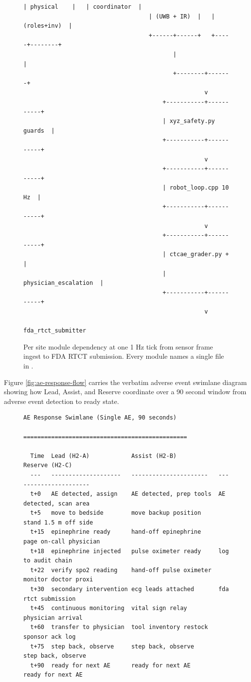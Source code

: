 \begin{sectionaccent}
\begin{figure}[H]
\begin{Verbatim}[fontsize=\footnotesize]
                                    | physical    |   | coordinator  |
                                    | (UWB + IR)  |   | (roles+inv)  |
                                    +------+------+   +-----+--------+
                                           |                |
                                           +--------+-------+
                                                    v
                                        +-----------+-----------+
                                        | xyz_safety.py guards  |
                                        +-----------+-----------+
                                                    v
                                        +-----------+-----------+
                                        | robot_loop.cpp 10 Hz  |
                                        +-----------+-----------+
                                                    v
                                        +-----------+-----------+
                                        | ctcae_grader.py +     |
                                        | physician_escalation  |
                                        +-----------+-----------+
                                                    v
                                            fda_rtct_submitter
\end{Verbatim}
\caption{Per site module dependency at one 1 Hz tick from sensor frame ingest to FDA RTCT submission. Every module names a single file in .}
\label{fig:module-dependency}
\end{figure}

Figure \ref{fig:ae-response-flow} carries the verbatim adverse event
swimlane diagram showing how Lead, Assist, and Reserve coordinate
over a 90 second window from adverse event detection to ready state.

\begin{figure}[H]
\centering
\begin{Verbatim}[fontsize=\footnotesize]
                       AE Response Swimlane (Single AE, 90 seconds)
                       ===============================================

  Time  Lead (H2-A)            Assist (H2-B)            Reserve (H2-C)
  ---   --------------------   ----------------------   ----------------------
  t+0   AE detected, assign    AE detected, prep tools  AE detected, scan area
  t+5   move to bedside        move backup position     stand 1.5 m off side
  t+15  epinephrine ready      hand-off epinephrine     page on-call physician
  t+18  epinephrine injected   pulse oximeter ready     log to audit chain
  t+22  verify spo2 reading    hand-off pulse oximeter  monitor doctor proxi
  t+30  secondary intervention ecg leads attached       fda rtct submission
  t+45  continuous monitoring  vital sign relay         physician arrival
  t+60  transfer to physician  tool inventory restock   sponsor ack log
  t+75  step back, observe     step back, observe       step back, observe
  t+90  ready for next AE      ready for next AE        ready for next AE


\end{Verbatim}
\end{figure}
\end{sectionaccent}
